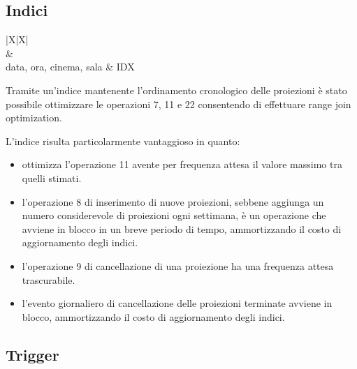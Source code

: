 \pagebreak

\subsection*{Indici}
%
%
\begin{tabularx}{\linewidth}{|X|X|}
    \hline
     \\\hline
     & 
    \\\hline
    data, ora, cinema, sala
     & IDX
    \\ \hline
\end{tabularx}

Tramite un'indice mantenente l'ordinamento cronologico delle proiezioni è stato
possibile ottimizzare le operazioni 7, 11 e 22 consentendo di effettuare
range join optimization.

L'indice risulta particolarmente vantaggioso in quanto:
\begin{itemize}
    \item ottimizza l'operazione 11 avente per frequenza attesa il valore
    massimo tra quelli stimati.
    \item l'operazione 8 di inserimento di nuove proiezioni,
    sebbene aggiunga un numero considerevole di proiezioni ogni settimana,
    è un operazione che avviene in blocco in un breve periodo di tempo,
    ammortizzando il costo di aggiornamento degli indici.
    \item l'operazione 9 di cancellazione di una proiezione ha una frequenza
    attesa trascurabile.
    \item l'evento giornaliero di cancellazione delle proiezioni terminate
    avviene in blocco, ammortizzando il costo di aggiornamento degli indici.
\end{itemize}

\pagebreak

\subsection*{Trigger}
%
%

